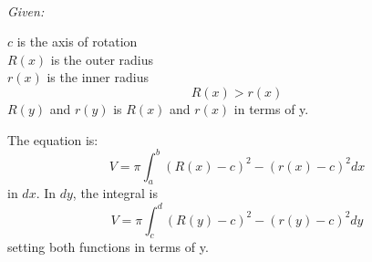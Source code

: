 \documentclass{article} %
\theoremstyle{theorem}
\theoremstyle{definition}
\begin{document}
                  \\\textit{Given:}
                    \begin{center}
                        $c$ is the axis of rotation\\
                        $R(x)$ is the outer radius\\ 
                        $r(x)$ is the inner radius $$R(x)>r(x)$$
                        $R(y)$ and $r(y)$ is $R(x)$ and $r(x)$ in terms of y.
                    \end{center}
                    The equation is:
                      \begin{equation}
                        \label{eq:volDonutDx}
                          V=\pi\int_a^b (R(x)-c)^2-(r(x)-c)^2dx
                      \end{equation}
                    in $dx$. In $dy$, the integral is 
                    \begin{equation}
                        \label{eq:volDonutDy}
                        V=\pi\int_c^d (R(y)-c)^2-(r(y)-c)^2dy
                    \end{equation}
                    setting both functions in terms of y.
\end{document}
